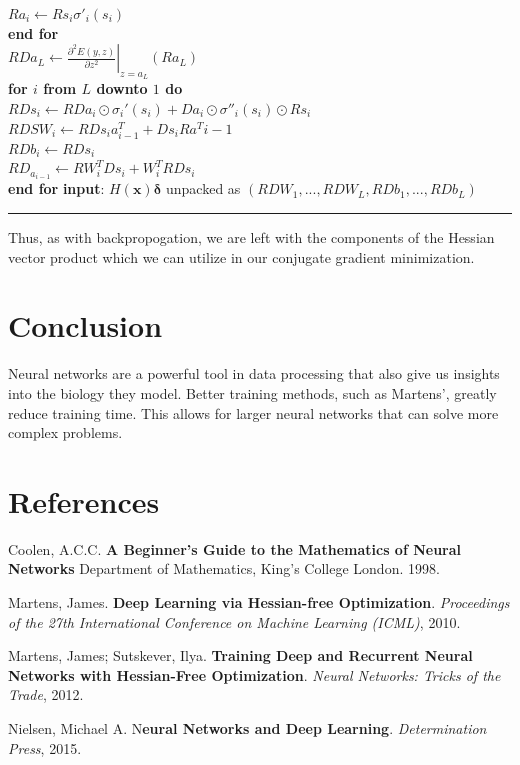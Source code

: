 \documentclass[]{article}
\newcommand{\B}[1]{\boldsymbol{#1}}
\newcommand{\pd}{\partial}
\newcommand{\tab}{\hspace*{.25in}}
\newcommand{\Hline}{\noindent\rule[0.5ex]{\linewidth}{.5pt}}
\theoremstyle{plain}
\theoremstyle{definition}
\begin{document}
\tab$ Ra_i\leftarrow Rs_i\sigma'_i(s_i) $\\
\textbf{end for}\\
$ RDa_L \leftarrow \left.\displaystyle\frac{\pd^2 E(y,z)}{\pd z^2}\right|_{z = {a_L}}\left(Ra_L\right) $\\
\textbf{for $ i $ from $ L $ downto $ 1 $ do}\\
\tab$ RDs_i\leftarrow RDa_i\odot\sigma_i'(s_i) + Da_i\odot \sigma''_i(s_i)\odot Rs_i$\\
\tab$ RDSW_i \leftarrow RDs_ia_{i-1}^T + Ds_iRa^T{i-1} $\\
\tab$ RDb_i \leftarrow RDs_i $\\
\tab$ RD_{a_{i-1}} \leftarrow RW_i^TDs_i + W_i^TRDs_i $\\
\textbf{end for}
\textbf{input}: $ H(\B{x})\B{\delta} $ unpacked as $ (RDW_1, ..., RDW_L, RDb_1, ... ,RDb_L) $\\
\Hline

Thus, as with backpropogation, we are left with the components of the Hessian vector product which we can utilize in our conjugate gradient minimization.

\section{Conclusion}

Neural networks are a powerful tool in data processing that also give us insights into the biology they model. Better training methods, such as Martens', greatly reduce training time. This allows for larger neural networks that can solve more complex problems. 

\section{References}

\hangindent=0.5in
\tab Coolen, A.C.C. \textbf{A Beginner's Guide to the
Mathematics of Neural Networks} Department of Mathematics, King's College London. 1998.

\hangindent=0.5in
Martens, James. \textbf{Deep Learning via Hessian-free Optimization}. \textit{Proceedings of the 27th International Conference on Machine Learning (ICML)}, 2010.

\hangindent=0.5in
Martens, James; Sutskever, Ilya. \textbf{Training Deep and Recurrent Neural Networks with Hessian-Free Optimization}. \textit{Neural Networks: Tricks of the Trade}, 2012.

\hangindent=0.5in
Nielsen, Michael A. N\textbf{eural Networks and
Deep Learning}. \textit{Determination Press}, 2015.
\end{document}
